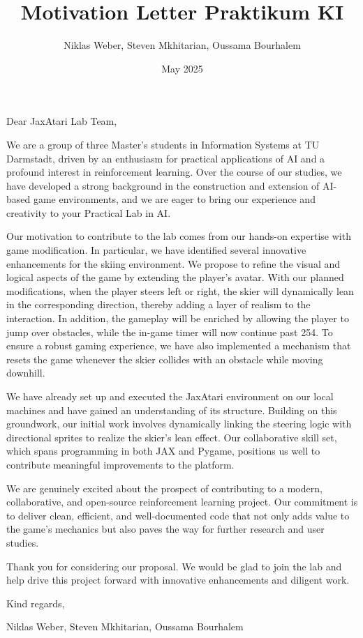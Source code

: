 \documentclass{article}
\title{Motivation Letter Praktikum KI}
\author{Niklas Weber, Steven Mkhitarian, Oussama Bourhalem}
\date{May 2025}
\begin{document}
\maketitle

Dear JaxAtari Lab Team,

We are a group of three Master’s students in Information Systems at TU Darmstadt, driven by an enthusiasm for practical applications of AI and a profound interest in reinforcement learning. Over the course of our studies, we have developed a strong background in the construction and extension of AI-based game environments, and we are eager to bring our experience and creativity to your Practical Lab in AI.

Our motivation to contribute to the lab comes from our hands-on expertise with game modification. In particular, we have identified several innovative enhancements for the skiing environment. We propose to refine the visual and logical aspects of the game by extending the player’s avatar. With our planned modifications, when the player steers left or right, the skier will dynamically lean in the corresponding direction, thereby adding a layer of realism to the interaction. In addition, the gameplay will be enriched by allowing the player to jump over obstacles, while the in-game timer will now continue past 254. To ensure a robust gaming experience, we have also implemented a mechanism that resets the game whenever the skier collides with an obstacle while moving downhill.

We have already set up and executed the JaxAtari environment on our local machines and have gained an understanding of its structure. Building on this groundwork, our initial work involves dynamically linking the steering logic with directional sprites to realize the skier’s lean effect. Our collaborative skill set, which spans programming in both JAX and Pygame, positions us well to contribute meaningful improvements to the platform.

We are genuinely excited about the prospect of contributing to a modern, collaborative, and open-source reinforcement learning project. Our commitment is to deliver clean, efficient, and well-documented code that not only adds value to the game’s mechanics but also paves the way for further research and user studies.

Thank you for considering our proposal. We would be glad to join the lab and help drive this project forward with innovative enhancements and diligent work.

Kind regards, 

Niklas Weber, Steven Mkhitarian, Oussama Bourhalem 
\end{document}
